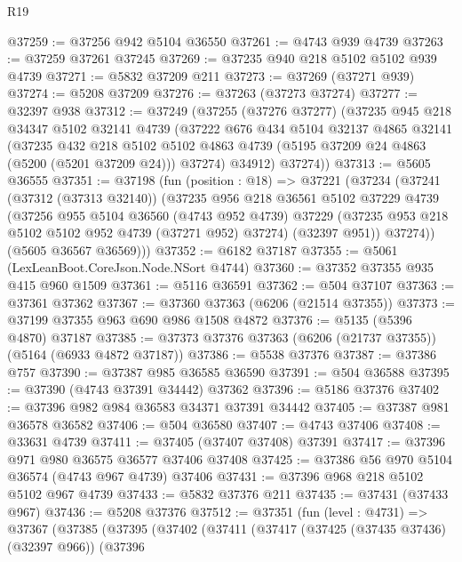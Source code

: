 \begin{lexlean}{R19}
\begin{coremodule}
{{{{{{{{{{{@37259 := @37256 @942 @5104 @36550
@37261 := @4743 @939 @4739
@37263 := @37259 @37261 @37245
@37269 := @37235 @940 @218 @5102 @5102 @939 @4739
@37271 := @5832 @37209 @211
@37273 := @37269 (@37271 @939)
@37274 := @5208 @37209
@37276 := @37263 (@37273 @37274)
@37277 := @32397 @938
@37312 := @37249
    (@37255
      (@37276 @37277)
      (@37235
        @945
        @218
        @34347
        @5102
        @32141
        @4739
        (@37222
          @676
          @434
          @5104
          @32137
          @4865
          @32141
          (@37235
            @432
            @218
            @5102
            @5102
            @4863
            @4739
            (@5195 @37209 @24 @4863 (@5200 (@5201 @37209 @24)))
            @37274)
          @34912)
        @37274))
@37313 := @5605 @36555
@37351 := @37198
    (fun (position : @18) =>
    @37221
      (@37234
        (@37241
          (@37312 (@37313 @32140))
          (@37235
            @956
            @218
            @36561
            @5102
            @37229
            @4739
            (@37256
              @955
              @5104
              @36560
              (@4743 @952 @4739)
              @37229
              (@37235 @953 @218 @5102 @5102 @952 @4739 (@37271 @952) @37274)
              (@32397 @951))
            @37274))
        (@5605 @36567 @36569)))
@37352 := @6182 @37187
@37355 := @5061 (LexLeanBoot.CoreJson.Node.NSort @4744)
@37360 := @37352 @37355 @935 @415 @960 @1509
@37361 := @5116 @36591
@37362 := @504 @37107
@37363 := @37361 @37362
@37367 := @37360 @37363 (@6206 (@21514 @37355))
@37373 := @37199 @37355 @963 @690 @986 @1508 @4872
@37376 := @5135 (@5396 @4870) @37187
@37385 := @37373 @37376 @37363 (@6206 (@21737 @37355)) (@5164 (@6933 @4872 @37187))
@37386 := @5538 @37376
@37387 := @37386 @757
@37390 := @37387 @985 @36585 @36590
@37391 := @504 @36588
@37395 := @37390 (@4743 @37391 @34442) @37362
@37396 := @5186 @37376
@37402 := @37396 @982 @984 @36583 @34371 @37391 @34442
@37405 := @37387 @981 @36578 @36582
@37406 := @504 @36580
@37407 := @4743 @37406
@37408 := @33631 @4739
@37411 := @37405 (@37407 @37408) @37391
@37417 := @37396 @971 @980 @36575 @36577 @37406 @37408
@37425 := @37386 @56 @970 @5104 @36574 (@4743 @967 @4739) @37406
@37431 := @37396 @968 @218 @5102 @5102 @967 @4739
@37433 := @5832 @37376 @211
@37435 := @37431 (@37433 @967)
@37436 := @5208 @37376
@37512 := @37351
    (fun (level : @4731) =>
    @37367
      (@37385
        (@37395
          (@37402
            (@37411
              (@37417
                (@37425 (@37435 @37436) (@32397 @966))
                (@37396
}}}}}}}}}}}
\end{coremodule}
\end{lexlean}
